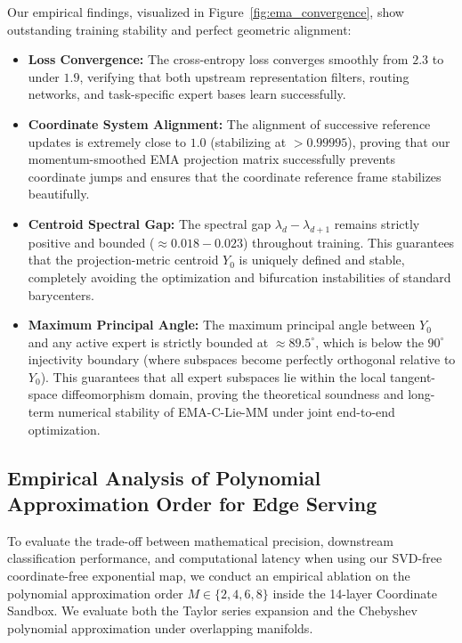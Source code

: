 \documentclass{article}
\theoremstyle{plain}
\theoremstyle{definition}
\theoremstyle{remark}
\begin{document}
        Our empirical findings, visualized in Figure~\ref{fig:ema_convergence}, show outstanding training stability and perfect geometric alignment:
        \begin{itemize}
        \item \textbf{Loss Convergence:} The cross-entropy loss converges smoothly from $2.3$ to under $1.9$, verifying that both upstream representation filters, routing networks, and task-specific expert bases learn successfully.
        \item \textbf{Coordinate System Alignment:} The alignment of successive reference updates is extremely close to $1.0$ (stabilizing at $> 0.99995$), proving that our momentum-smoothed EMA projection matrix successfully prevents coordinate jumps and ensures that the coordinate reference frame stabilizes beautifully.
        \item \textbf{Centroid Spectral Gap:} The spectral gap $\lambda_d - \lambda_{d+1}$ remains strictly positive and bounded ($\approx 0.018 - 0.023$) throughout training. This guarantees that the projection-metric centroid $Y_0$ is uniquely defined and stable, completely avoiding the optimization and bifurcation instabilities of standard barycenters.
        \item \textbf{Maximum Principal Angle:} The maximum principal angle between $Y_0$ and any active expert is strictly bounded at $\approx 89.5^\circ$, which is below the $90^\circ$ injectivity boundary (where subspaces become perfectly orthogonal relative to $Y_0$). This guarantees that all expert subspaces lie within the local tangent-space diffeomorphism domain, proving the theoretical soundness and long-term numerical stability of EMA-C-Lie-MM under joint end-to-end optimization.
        \end{itemize}

        \subsection{Empirical Analysis of Polynomial Approximation Order for Edge Serving}
To evaluate the trade-off between mathematical precision, downstream classification performance, and computational latency when using our SVD-free coordinate-free exponential map, we conduct an empirical ablation on the polynomial approximation order $M \in \{2, 4, 6, 8\}$ inside the 14-layer Coordinate Sandbox. We evaluate both the Taylor series expansion and the Chebyshev polynomial approximation under overlapping manifolds.
\end{document}
